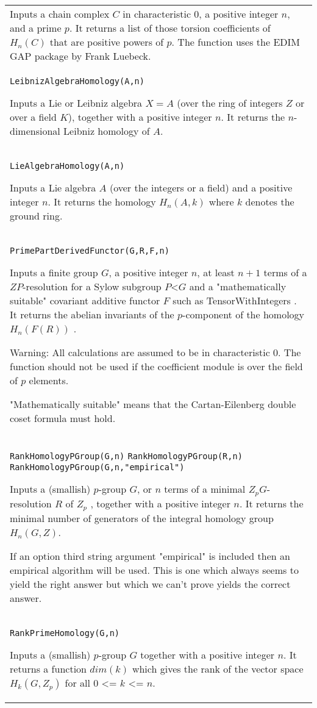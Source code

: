 \documentclass[a4paper,11pt]{report}
\begin{document}
{\begin{center}
\begin{tabular}{|l|}
 Inputs a chain complex $C$ in characteristic 0, a positive integer $n$, and a prime $p$. It returns a list of those torsion coefficients of $H_n(C)$ that are positive powers of $p$. The function uses the EDIM GAP package by Frank Luebeck. \\
 \index{LeibnizAlgebraHomology} \texttt{LeibnizAlgebraHomology(A,n)} 

 Inputs a Lie or Leibniz algebra $X=A$ (over the ring of integers $Z$ or over a field $K$), together with a positive integer $n$. It returns the $n$-dimensional Leibniz homology of $A$. \\
 \index{LieAlgebraHomology} \texttt{LieAlgebraHomology(A,n)} 

 Inputs a Lie algebra $A$ (over the integers or a field) and a positive integer $n$. It returns the homology $H_n(A,k)$ where $k$ denotes the ground ring. \\
 \index{PrimePartDerivedFunctor} \texttt{PrimePartDerivedFunctor(G,R,F,n)} 

 Inputs a finite group $G$, a positive integer $n$, at least $n+1$ terms of a $ZP$-resolution for a Sylow subgroup $P${\textless}$G$ and a "mathematically suitable" covariant additive functor $F$ such as TensorWithIntegers . It returns the abelian invariants of the $p$-component of the homology $H_n(F(R))$ . 

 Warning: All calculations are assumed to be in characteristic 0. The function
should not be used if the coefficient module is over the field of $p$ elements. 

 "Mathematically suitable" means that the Cartan-Eilenberg double coset formula
must hold. \\
 \index{RankHomologyPGroup} \texttt{RankHomologyPGroup(G,n)} {\nobreakspace} \texttt{RankHomologyPGroup(R,n)} {\nobreakspace} \texttt{RankHomologyPGroup(G,n,"empirical")} 

 Inputs a (smallish) $p$-group $G$, or $n$ terms of a minimal $Z_pG$-resolution $R$ of $Z_p$ , together with a positive integer $n$. It returns the minimal number of generators of the integral homology group $H_n(G,Z)$. 

 If an option third string argument "empirical" is included then an empirical
algorithm will be used. This is one which always seems to yield the right
answer but which we can't prove yields the correct answer. \\
 \index{RankPrimeHomology} \texttt{RankPrimeHomology(G,n)} 

 Inputs a (smallish) $p$-group $G$ together with a positive integer $n$. It returns a function $dim(k)$ which gives the rank of the vector space $H_k(G,Z_p)$ for all $0$ {\textless}= $k$ {\textless}= $n$. \\
\end{tabular}\\[2mm]
\end{center}

 }
\end{document}
